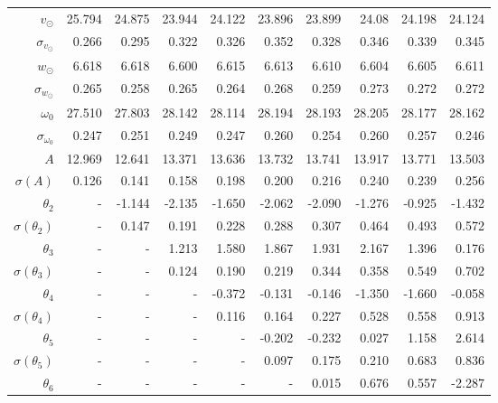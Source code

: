 \documentclass{matmex-diploma-custom}
\begin{document}
\begin{table}[h!!]
\begin{tabular}{r|rr|rrr|rrrr}
 $v_{\odot} $& 25.794      &   24.875 &   23.944 &   24.122 &   23.896 &   23.899 &    24.08 &   24.198 &   24.124 \\
 $\sigma_{v_{\odot}}$&0.266       &    0.295 &    0.322 &    0.326 &    0.352 &    0.328 &    0.346 &    0.339 &    0.345 \\
 $w_{\odot} $& 6.618       &    6.618 &      6.600 &    6.615 &    6.613 &     6.610 &    6.604 &    6.605 &    6.611 \\
 $\sigma_{w_{\odot}}$&0.265       &    0.258 &    0.265 &    0.264 &    0.268 &    0.259 &    0.273 &    0.272 &    0.272 \\
 $\omega_0 $&27.510      &   27.803 &   28.142 &   28.114 &   28.194 &   28.193 &   28.205 &   28.177 &   28.162 \\
 $\sigma_{\omega_0} $& 0.247       &    0.251 &    0.249 &    0.247 &     0.260 &    0.254 &     0.260 &    0.257 &    0.246 \\\hline
 $A $&12.969      &   12.641 &   13.371 &   13.636 &   13.732 &   13.741 &   13.917 &   13.771 &   13.503 \\
 $\sigma(A) $ & 0.126       &    0.141 &    0.158 &    0.198 &      0.200 &    0.216 &     0.240 &    0.239 &    0.256 \\
 $\theta_2$&-        &  -1.144 &   -2.135 &    -1.650 &   -2.062 &    -2.090 &   -1.276 &   -0.925 &   -1.432 \\
 $\sigma(\theta_2)$&-      &    0.147 &    0.191 &    0.228 &    0.288 &    0.307 &    0.464 &    0.493 &    0.572 \\
 $\theta_3$&-      &    - &   1.213 &    1.580 &    1.867 &    1.931 &    2.167 &    1.396 &    0.176 \\
 $\sigma(\theta_3)$&-      &    - &   0.124 &    0.190 &    0.219 &    0.344 &    0.358 &    0.549 &    0.702 \\
 $\theta_4$&-      &    - &    - &  -0.372 &   -0.131 &   -0.146 &   -1.350 &   -1.660 &   -0.058 \\
 $\sigma(\theta_4)$&-      &    - &    - &    0.116 &    0.164 &    0.227 &    0.528 &    0.558 &    0.913 \\
 $\theta_5$&-      &    - &    - &    - &  -0.202 &   -0.232 &    0.027 &    1.158 &    2.614 \\
 $\sigma(\theta_5)$&-      &    - &    - &    - &    0.097 &    0.175 &    0.210 &    0.683 &    0.836 \\
 $\theta_6$&-      &    - &    - &    - &    - &   0.015 &    0.676 &    0.557 &   -2.287 \\

\end{tabular}
\end{table}
\end{document}
